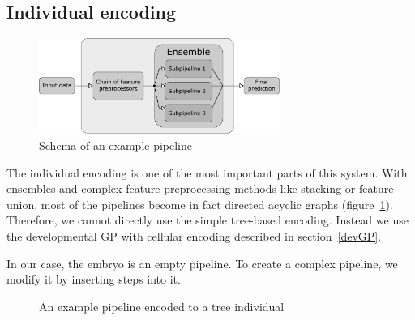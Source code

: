 \subsection{Individual encoding} \label{sec:encoding}
\begin{figure}[ht]\centering
\includegraphics[width=0.7\textwidth]{../img/pipeline-pdfa.pdf}
\caption{Schema of an example pipeline}
\label{pic02:pipeline}
\end{figure}

The individual encoding is one of the most important parts of this system. With
ensembles and complex feature preprocessing methods like stacking or feature
union, most of the pipelines become in fact directed acyclic graphs (figure~\ref{pic02:pipeline}). Therefore, we cannot directly use the simple tree-based
encoding. Instead we use the developmental GP with cellular encoding described
in section~\ref{devGP}.

In our case, the embryo is an empty pipeline. To create a complex pipeline, we
modify it by inserting steps into it.

\begin{figure}[ht]\centering
    \qquad
    \caption{An example pipeline encoded to a tree individual}%
    \label{pic:pipeencoding}%
\end{figure}

